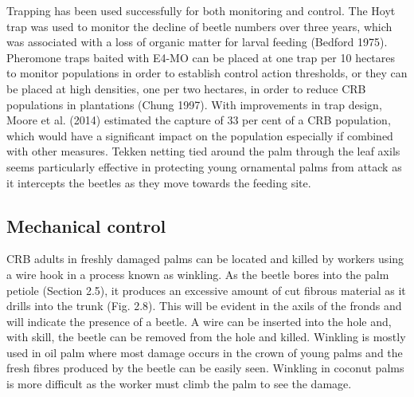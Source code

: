 \documentclass[twocolumn,letterpaper]{scrartcl}
\begin{document}
Trapping has been used successfully for both monitoring and control. The Hoyt trap was used to monitor the 
decline of beetle numbers over three years, which was associated with a loss of organic matter for larval feeding 
(Bedford 1975). Pheromone traps baited with E4-MO can be placed at one trap per 10 hectares to monitor 
populations in order to establish control action thresholds, or they can be placed at high densities, one per two 
hectares, in order to reduce CRB populations in plantations (Chung 1997). With improvements in trap design, 
Moore et al. (2014) estimated the capture of 33 per cent of a CRB population, which would have a significant 
impact on the population especially if combined with other measures. Tekken netting tied around the palm 
through  the  leaf  axils  seems  particularly  effective  in  protecting  young  ornamental  palms  from  attack  as  it 
intercepts the beetles as they move towards the feeding site. 

\subsection{Mechanical control}
CRB adults in freshly damaged palms can be located and killed by workers using a wire hook in a process known 
as winkling. As the beetle bores into the palm petiole (Section 2.5), it produces an excessive amount of cut 
fibrous material as it drills into the trunk (Fig. 2.8). This will be evident in the axils of the fronds and will indicate 
the presence of a beetle. A wire can be inserted into the hole and, with skill, the beetle can be removed from 
the hole and killed. Winkling is mostly used in oil palm where most damage occurs in the crown of young palms 
and the fresh fibres produced by the beetle can be easily seen. Winkling in coconut palms is more difficult as 
the worker must climb the palm to see the damage. 
\end{document}
